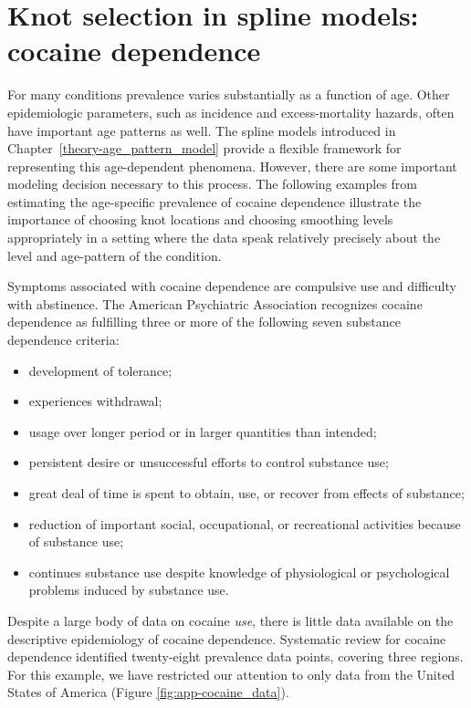 \chapter{Knot selection in spline models: cocaine dependence}
\label{applications-splines_knot_loc}

For many conditions prevalence varies substantially as a function of
age.  Other epidemiologic parameters, such as incidence and
excess-mortality hazards, often have important age patterns as well.
The spline models introduced in Chapter~\ref{theory-age_pattern_model}
provide a flexible framework for representing this age-dependent
phenomena.  However, there are some important modeling decision
necessary to this process.  The following examples from estimating the
age-specific prevalence of cocaine dependence illustrate the
importance of choosing knot locations and choosing smoothing levels
appropriately in a setting where the data speak relatively precisely
about the level and age-pattern of the condition.

Symptoms associated with cocaine dependence are compulsive use and
difficulty with abstinence.  The American Psychiatric Association
recognizes cocaine dependence as fulfilling three or more of the
following seven substance dependence criteria: \cite{american_diagnostic_2000, wagner_first_2002}
    \begin{itemize} \label{page:app-substance_dependence}
        \item development of tolerance;
        \item experiences withdrawal;
        \item usage over longer period or in larger quantities than intended;
        \item persistent desire or unsuccessful efforts to control
          substance use;
        \item great deal of time is spent to obtain, use, or recover
          from effects of substance;
        \item reduction of important social, occupational, or recreational
          activities because of substance use;
        \item continues substance use despite knowledge of
          physiological or psychological problems induced by substance
          use.
    \end{itemize}

Despite a large body of data on cocaine \emph{use}, there is little
data available on the descriptive epidemiology of cocaine
dependence.\cite{degenhardt_what_2011} Systematic review for cocaine
dependence identified twenty-eight prevalence data points,
covering three regions.  For this example, we have restricted our attention
to only data from the United States of America (Figure \ref{fig:app-cocaine_data}).

